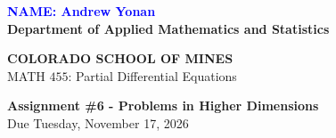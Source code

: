 \documentclass[12pt]{article}
\begin{document}
\begin{flushleft}

\textcolor{blue}{\textbf{NAME: Andrew Yonan}}\\
\textbf{Department of Applied Mathematics and Statistics}

\textbf{COLORADO SCHOOL OF MINES}\\


MATH $455$: Partial Differential Equations
\end{flushleft}

\vspace{0.1in}

\begin{center}
{\bf Assignment \#6 - Problems in Higher Dimensions} \\
Due Tuesday, November 17, 2026 \\
\end{center}

\vspace{0.2in}
\end{document}
